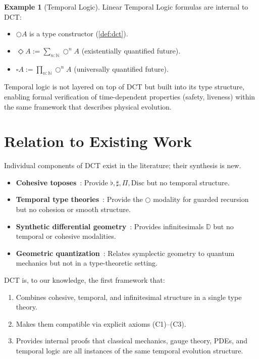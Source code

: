 \documentclass[11pt,a4paper]{article}
\theoremstyle{plain}
\theoremstyle{definition}
\newtheorem{example}[theorem]{Example}
\theoremstyle{remark}
\newcommand{\N}{\mathbb{N}}
\newcommand{\D}{\mathbb{D}}
\newcommand{\Disc}{\mathrm{Disc}}
\begin{document}
\begin{example}[Temporal Logic]
\label{ex:ltl}
Linear Temporal Logic formulas are internal to DCT:
\begin{itemize}[nosep]
    \item $\bigcirc A$ is a type constructor (\cref{def:dct}).
    \item $\Diamond A := \sum_{n:\N} \bigcirc^n A$ (existentially quantified future).
    \item $\square A := \prod_{n:\N} \bigcirc^n A$ (universally quantified future).
\end{itemize}
Temporal logic is not layered on top of DCT but built into its type structure, enabling formal verification of time-dependent properties (safety, liveness) within the same framework that describes physical evolution.
\end{example}

\section{Relation to Existing Work}
\label{sec:related}

Individual components of DCT exist in the literature; their synthesis is new.

\begin{itemize}[nosep]
    \item \textbf{Cohesive toposes}~\cite{lawvere,schreiber}: Provide $\flat, \sharp, \Pi, \Disc$ but no temporal structure.
    \item \textbf{Temporal type theories}~\cite{nakano}: Provide the $\bigcirc$ modality for guarded recursion but no cohesion or smooth structure.
    \item \textbf{Synthetic differential geometry}~\cite{kock}: Provides infinitesimals $\D$ but no temporal or cohesive modalities.
    \item \textbf{Geometric quantization}~\cite{woodhouse}: Relates symplectic geometry to quantum mechanics but not in a type-theoretic setting.
\end{itemize}

DCT is, to our knowledge, the first framework that:
\begin{enumerate}[nosep]
    \item Combines cohesive, temporal, and infinitesimal structure in a single type theory.
    \item Makes them compatible via explicit axioms (C1)--(C3).
    \item Provides internal proofs that classical mechanics, gauge theory, PDEs, and temporal logic are all instances of the same temporal evolution structure.
\end{enumerate}
\end{document}
